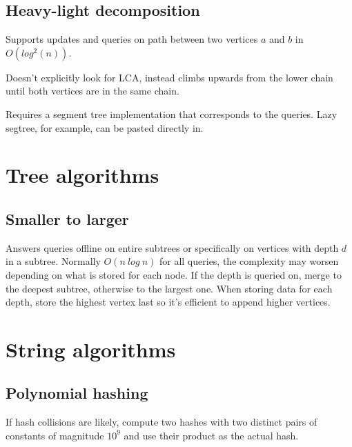 \documentclass{article}
\begin{document}
\subsection {Heavy-light decomposition}

Supports updates and queries on path between two vertices $a$ and $b$ in $O(log^2(n))$.

Doesn't explicitly look for LCA, instead climbs upwards from the lower chain until both vertices are in the same chain.

Requires a segment tree implementation that corresponds to the queries. Lazy segtree, for example, can be pasted directly in.



\section {Tree algorithms}

\subsection {Smaller to larger}

Answers queries offline on entire subtrees or specifically on vertices with depth $d$ in a subtree. Normally $O(n\ log\ n)$ for all queries, the complexity may worsen depending on what is stored for each node. If the depth is queried on, merge to the deepest subtree, otherwise to the largest one. When storing data for each depth, store the highest vertex last so it's efficient to append higher vertices.



\section {String algorithms}

\subsection {Polynomial hashing}

If hash collisions are likely, compute two hashes with two distinct pairs of constants of magnitude $10^9$ and use their product as the actual hash.


\end{document}
